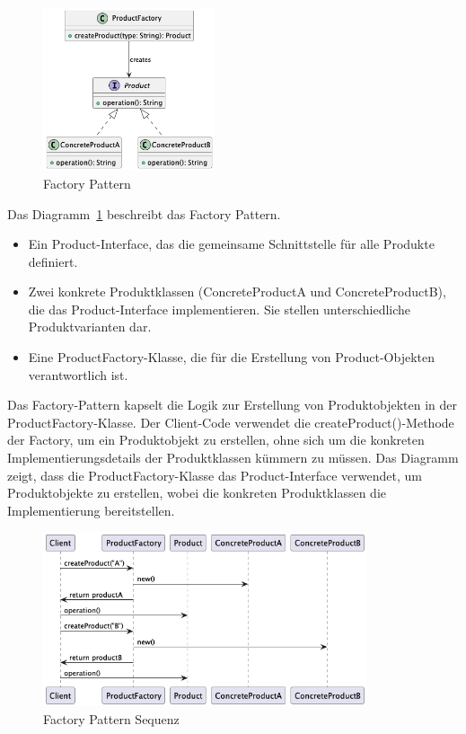 \documentclass[../vs-script-first-v01.tex]{subfiles}
\begin{document}
\begin{figure}[!ht]
  \centering
  \includegraphics[width=0.45\textwidth]{fig/uml/factory-class.png}
  \caption{Factory Pattern}
  \label{fig:factory-class}
\end{figure}
Das Diagramm~\ref{fig:factory-class} beschreibt das Factory Pattern.
\begin{itemize}
\item Ein Product-Interface, das die gemeinsame Schnittstelle für alle Produkte definiert.
\item Zwei konkrete Produktklassen (ConcreteProductA und ConcreteProductB), die das Product-Interface implementieren. Sie stellen unterschiedliche Produktvarianten dar.
\item Eine ProductFactory-Klasse, die für die Erstellung von Product-Objekten verantwortlich ist.
\end{itemize}
Das Factory-Pattern kapselt die Logik zur Erstellung von Produktobjekten in der ProductFactory-Klasse. Der Client-Code verwendet die createProduct()-Methode der Factory, um ein Produktobjekt zu erstellen, ohne sich um die konkreten Implementierungsdetails der Produktklassen kümmern zu müssen. Das Diagramm zeigt, dass die ProductFactory-Klasse das Product-Interface verwendet, um Produktobjekte zu erstellen, wobei die konkreten Produktklassen die Implementierung bereitstellen.

\begin{figure}[!ht]
  \centering
  \includegraphics[width=0.85\textwidth]{fig/uml/factory-seq.png}
  \caption{Factory Pattern Sequenz}
  \label{fig:factory-seq}
\end{figure}
\end{document}
